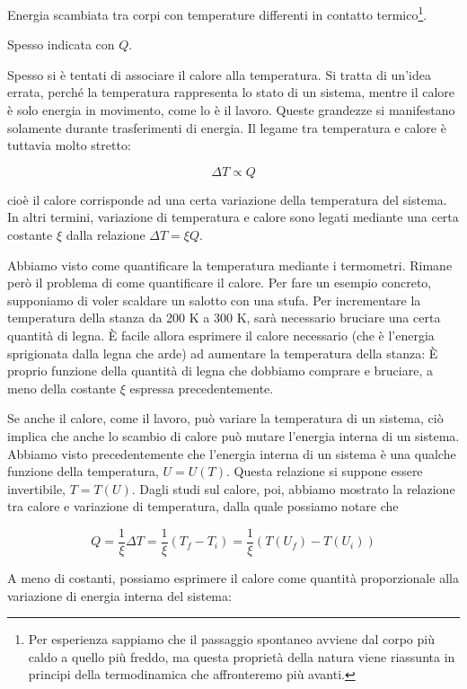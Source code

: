\begin{tcolorbox}[colback = red!30, colframe = red!30!black, title = {Calore}]
Energia scambiata tra corpi con temperature differenti in contatto termico\footnote{Per esperienza sappiamo che il passaggio spontaneo avviene
dal corpo più caldo a quello più freddo, ma questa proprietà della natura viene riassunta in principi della termodinamica che affronteremo più avanti.}.

Spesso indicata con $Q$.
\end{tcolorbox}

Spesso si è tentati di associare il calore alla temperatura. Si
tratta di un'idea errata, perché la temperatura rappresenta lo
stato di un sistema, mentre il calore è solo energia in movimento,
come lo è il lavoro. Queste grandezze si manifestano solamente
durante trasferimenti di energia. Il legame tra temperatura e calore
è tuttavia molto stretto:

\[ \Delta T \propto Q \]

\noindent cioè il calore corrisponde ad una certa variazione della temperatura
del sistema. In altri termini, variazione di temperatura e calore sono legati
mediante una certa costante $\xi$ dalla relazione $\Delta T = \xi Q$.

Abbiamo visto come quantificare la temperatura mediante i termometri. Rimane
però il problema di come quantificare il calore. Per fare un
esempio concreto, supponiamo di voler scaldare un salotto con una stufa. Per
incrementare la temperatura della stanza da 200 K a 300 K, sarà necessario
bruciare una certa quantità di legna. È facile allora esprimere il calore
necessario (che è l'energia sprigionata dalla legna che arde) ad aumentare
la temperatura della stanza: È proprio funzione della quantità di legna che dobbiamo
comprare e bruciare, a meno della costante $\xi$ espressa precedentemente.

Se anche il calore, come il lavoro, può variare la temperatura di un sistema,
ciò implica che anche lo scambio di calore può mutare l'energia interna di
un sistema.
Abbiamo visto precedentemente che l'energia interna di un sistema è una qualche
funzione della temperatura, $U = U(T)$. Questa relazione si suppone essere
invertibile, $T = T(U)$. Dagli studi sul calore, poi, abbiamo mostrato la
relazione tra calore e variazione di temperatura, dalla quale possiamo notare
che

\[ Q = \frac{1}{\xi}\Delta T = \frac{1}{\xi}(T_f - T_i) = \frac{1}{\xi}(T(U_f) - T(U_i)) \]

\noindent A meno di costanti, possiamo esprimere il calore come quantità
proporzionale alla variazione di energia interna del sistema:

